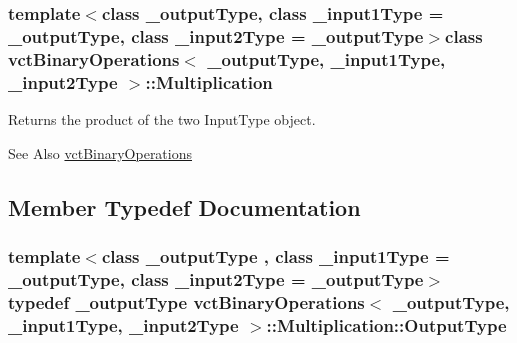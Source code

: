 \subsubsection*{template$<$class \-\_\-output\-Type, class \-\_\-input1\-Type = \-\_\-output\-Type, class \-\_\-input2\-Type = \-\_\-output\-Type$>$class vct\-Binary\-Operations$<$ \-\_\-output\-Type, \-\_\-input1\-Type, \-\_\-input2\-Type $>$\-::\-Multiplication}

Returns the product of the two Input\-Type object. 

\begin{DoxySeeAlso}{See Also}
\hyperlink{classvct_binary_operations}{vct\-Binary\-Operations} 
\end{DoxySeeAlso}


\subsection{Member Typedef Documentation}
\hypertarget{classvct_binary_operations_1_1_multiplication_a54b8e0ebb628e865d7d5221b2b8dc898}{
\subsubsection[{Output\-Type}]{\setlength{\rightskip}{0pt plus 5cm}template$<$class \-\_\-output\-Type , class \-\_\-input1\-Type  = \-\_\-output\-Type, class \-\_\-input2\-Type  = \-\_\-output\-Type$>$ typedef \-\_\-output\-Type {\bf vct\-Binary\-Operations}$<$ \-\_\-output\-Type, \-\_\-input1\-Type, \-\_\-input2\-Type $>$\-::{\bf Multiplication\-::\-Output\-Type}}}\label{classvct_binary_operations_1_1_multiplication_a54b8e0ebb628e865d7d5221b2b8dc898}


